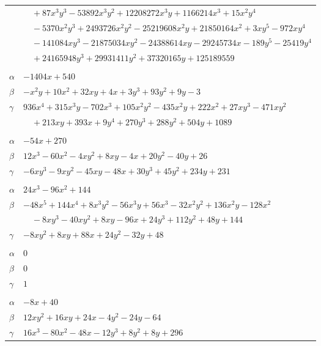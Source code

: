 \documentclass[11pt]{article}
\begin{document}
\begin{longtable}{@{}ll@{}}
 & $\quad +87x^{3}y^{3}-53892x^{3}y^{2}+12208272x^{3}y+1166214x^{3}+15x^{2}y^{4}$\\
 & $\quad -5370x^{2}y^{3}+2493726x^{2}y^{2}-25219608x^{2}y+21850164x^{2}+3xy^{5}-972xy^{4}$\\
 & $\quad -141084xy^{3}-21875034xy^{2}-24388614xy-29245734x-189y^{5}-25419y^{4}$\\
 & $\quad +24165948y^{3}+29931411y^{2}+37320165y+125189559$\\
\addlinespace[3pt]
\multicolumn{2}{@{}l}{$\{i,j\}=\{97,207\}$, $k_{ij}=2^{2}\cdot 3^{3}\cdot 5^{2}$}\\
$\alpha$ & $-1404x+540$\\
$\beta$ & $-x^{2}y+10x^{2}+32xy+4x+3y^{3}+93y^{2}+9y-3$\\
$\gamma$ & $936x^{4}+315x^{3}y-702x^{3}+105x^{2}y^{2}-435x^{2}y+222x^{2}+27xy^{3}-471xy^{2}$\\
 & $\quad +213xy+393x+9y^{4}+270y^{3}+288y^{2}+504y+1089$\\
\addlinespace[3pt]
\multicolumn{2}{@{}l}{$\{i,j\}=\{97,208\}$, $k_{ij}=2\cdot 3^{3}\cdot 5^{2}$}\\
$\alpha$ & $-54x+270$\\
$\beta$ & $12x^{3}-60x^{2}-4xy^{2}+8xy-4x+20y^{2}-40y+26$\\
$\gamma$ & $-6xy^{3}-9xy^{2}-45xy-48x+30y^{3}+45y^{2}+234y+231$\\
\addlinespace[3pt]
\multicolumn{2}{@{}l}{$\{i,j\}=\{105,123\}$, $k_{ij}=2^{4}\cdot 3^{3}$}\\
$\alpha$ & $24x^{3}-96x^{2}+144$\\
$\beta$ & $-48x^{5}+144x^{4}+8x^{3}y^{2}-56x^{3}y+56x^{3}-32x^{2}y^{2}+136x^{2}y-128x^{2}$\\
 & $\quad -8xy^{3}-40xy^{2}+8xy-96x+24y^{3}+112y^{2}+48y+144$\\
$\gamma$ & $-8xy^{2}+8xy+88x+24y^{2}-32y+48$\\
\addlinespace[3pt]
\multicolumn{2}{@{}l}{$\{i,j\}=\{105,204\}$, $k_{ij}=2^{2}\cdot 3$}\\
$\alpha$ & $0$\\
$\beta$ & $0$\\
$\gamma$ & $1$\\
\addlinespace[3pt]
\multicolumn{2}{@{}l}{$\{i,j\}=\{110,111\}$, $k_{ij}=2^{4}\cdot 3^{2}\cdot 7$}\\
$\alpha$ & $-8x+40$\\
$\beta$ & $12xy^{2}+16xy+24x-4y^{2}-24y-64$\\
$\gamma$ & $16x^{3}-80x^{2}-48x-12y^{3}+8y^{2}+8y+296$\\

\end{longtable}
\end{document}
